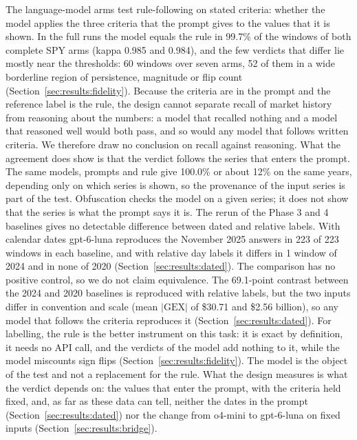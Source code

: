 The language-model arms test rule-following on stated criteria: whether the model applies the three criteria that the prompt gives to the values that it is shown. In the full runs the model equals the rule in 99.7\% of the windows of both complete SPY arms (kappa 0.985 and 0.984), and the few verdicts that differ lie mostly near the thresholds: 60 windows over seven arms, 52 of them in a wide borderline region of persistence, magnitude or flip count (Section~\ref{sec:results:fidelity}). Because the criteria are in the prompt and the reference label is the rule, the design cannot separate recall of market history from reasoning about the numbers: a model that recalled nothing and a model that reasoned well would both pass, and so would any model that follows written criteria. We therefore draw no conclusion on recall against reasoning. What the agreement does show is that the verdict follows the series that enters the prompt. The same models, prompts and rule give 100.0\% or about 12\% on the same years, depending only on which series is shown, so the provenance of the input series is part of the test. Obfuscation checks the model on a given series; it does not show that the series is what the prompt says it is.
The rerun of the Phase 3 and 4 baselines gives no detectable difference between dated and relative labels. With calendar dates gpt-6-luna reproduces the November 2025 answers in 223 of 223 windows in each baseline, and with relative day labels it differs in 1 window of 2024 and in none of 2020 (Section~\ref{sec:results:dated}). The comparison has no positive control, so we do not claim equivalence. The 69.1-point contrast between the 2024 and 2020 baselines is reproduced with relative labels, but the two inputs differ in convention and scale (mean $|\mathrm{GEX}|$ of \$30.71 and \$2.56 billion), so any model that follows the criteria reproduces it (Section~\ref{sec:results:dated}).
For labelling, the rule is the better instrument on this task: it is exact by definition, it needs no API call, and the verdicts of the model add nothing to it, while the model miscounts sign flips (Section~\ref{sec:results:fidelity}). The model is the object of the test and not a replacement for the rule. What the design measures is what the verdict depends on: the values that enter the prompt, with the criteria held fixed, and, as far as these data can tell, neither the dates in the prompt (Section~\ref{sec:results:dated}) nor the change from o4-mini to gpt-6-luna on fixed inputs (Section~\ref{sec:results:bridge}).

